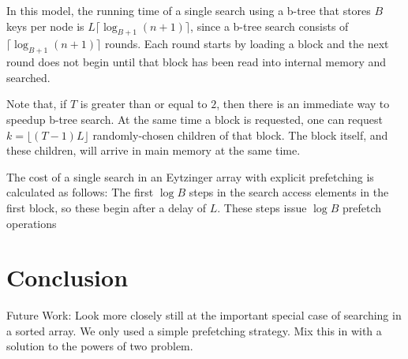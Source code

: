 \documentclass{patmorin}
\begin{document}
In this model, the running time of a single search using a b-tree that
stores $B$ keys per node is $L\lceil\log_{B+1}(n+1)\rceil$, since a
b-tree search consists of $\lceil\log_{B+1}(n+1)\rceil$ rounds. Each
round starts by loading a block and the next round does not begin until
that block has been read into internal memory and searched.

Note that, if $T$ is greater than or equal to $2$, then there is an
immediate way to speedup b-tree search. At the same time a block is
requested, one can request $k=\lfloor (T-1)L\rfloor$ randomly-chosen
children of that block.  The block itself, and these children, will
arrive in main memory at the same time.  

The cost of a single search in an Eytzinger array with explicit
prefetching is calculated as follows:  The first $\log B$ steps in the
search access elements in the first block, so these begin after a delay
of $L$. These steps issue $\log B$ prefetch operations

\section{Conclusion}

Future Work: Look more closely still at the important special case of searching
in a sorted array. We only used a simple prefetching strategy. Mix this
in with a solution to the powers of two problem.
\end{document}
